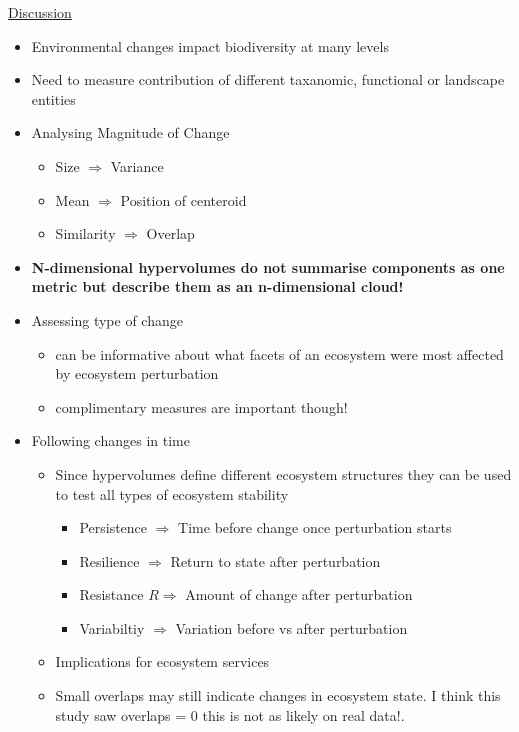 \documentclass[11pt]{article}
\begin{document}
	\underline{Discussion} 
	\begin{itemize}
		\item Environmental changes impact biodiversity at many levels
		\item Need to measure contribution of different taxanomic, functional or landscape entities
		
		\item Analysing Magnitude of Change
		\begin{itemize}
			\item Size $\Rightarrow$ Variance
			\item Mean $\Rightarrow$ Position of centeroid
			\item Similarity $\Rightarrow$ Overlap
		\end{itemize}
	
		\item \textbf{N-dimensional hypervolumes do not summarise components as one metric but describe them as an n-dimensional cloud!}
		
		\item Assessing type of change
		\begin{itemize}
			\item can be informative about what facets of an ecosystem were most affected by ecosystem perturbation
			\item complimentary measures are important though!
		\end{itemize}
	
		\item Following changes in time
		\begin{itemize}
			\item Since hypervolumes define different ecosystem structures they can be used to test all types of ecosystem stability
			\begin{itemize}
				\item Persistence $\Rightarrow$ Time before change once perturbation starts
				\item Resilience $\Rightarrow$ Return to state after perturbation
				\item Resistance $R\Rightarrow$ Amount of change after perturbation
				\item Variabiltiy $\Rightarrow$ Variation before vs after perturbation
			\end{itemize}
			\item Implications for ecosystem services
			\item Small overlaps may still indicate changes in ecosystem state. I think this study saw overlaps = 0 this is not as likely on real data!. 
		\end{itemize}
	

\end{itemize}
\end{document}
